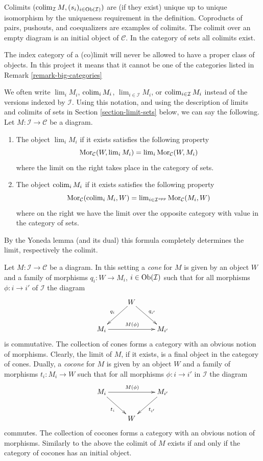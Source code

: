 \noindent
Colimits $(\mathop{\mathrm{colim}}\nolimits_\mathcal{I} M, (s_i)_{i\in \mathop{\mathrm{Ob}}\nolimits(\mathcal{I})})$ are
(if they exist) unique up to unique isomorphism by the uniqueness requirement
in the definition. Coproducts of pairs, pushouts, and coequalizers are
examples of colimits. The colimit over an empty diagram is an initial object
of $\mathcal{C}$. In the category of sets all colimits exist.

\begin{remark}
\label{remark-diagram-small}
The index category of a (co)limit will never be allowed to have
a proper class of objects. In this project it means that
it cannot be one of the categories listed in
Remark \ref{remark-big-categories}
\end{remark}

\begin{remark}
\label{remark-limit-colim}
We often write $\lim_i M_i$, $\mathop{\mathrm{colim}}\nolimits_i M_i$,
$\lim_{i\in \mathcal{I}} M_i$, or $\mathop{\mathrm{colim}}\nolimits_{i\in \mathcal{I}} M_i$
instead of the versions indexed by $\mathcal{I}$.
Using this notation, and using the description of
limits and colimits of sets in Section \ref{section-limit-sets}
below, we can say the following.
Let $M : \mathcal{I} \to \mathcal{C}$ be a diagram.
\begin{enumerate}
\item The object $\lim_i M_i$ if it exists satisfies the following property
$$
\mathop{\mathrm{Mor}}\nolimits_\mathcal{C}(W, \mathop{\mathrm{lim}}\nolimits_i M_i)
=
\mathop{\mathrm{lim}}\nolimits_i \mathop{\mathrm{Mor}}\nolimits_\mathcal{C}(W, M_i)
$$
where the limit on the right takes place in the category of sets.
\item The object $\mathop{\mathrm{colim}}\nolimits_i M_i$ if it
exists satisfies the following property
$$
\mathop{\mathrm{Mor}}\nolimits_\mathcal{C}(\mathop{\mathrm{colim}}\nolimits_i M_i, W)
=
\mathop{\mathrm{lim}}\nolimits_{i \in \mathcal{I}^{opp}} \mathop{\mathrm{Mor}}\nolimits_\mathcal{C}(M_i, W)
$$
where on the right we have the limit over the opposite category
with value in the category of sets.
\end{enumerate}
By the Yoneda lemma (and its dual) this formula completely determines the
limit, respectively the colimit.
\end{remark}

\begin{remark}
\label{remark-cones-and-cocones}
Let $M : \mathcal{I} \to \mathcal{C}$ be a diagram. In this setting a
{\it cone} for $M$ is given by an object $W$ and a family of morphisms
$q_i : W \to M_i$, $i \in \mathop{\mathrm{Ob}}\nolimits(\mathcal{I})$ such that for all morphisms
$\phi : i \to i'$ of $\mathcal{I}$ the diagram
$$
\xymatrix{
& W \ar[dl]_{q_i} \ar[dr]^{q_{i'}} \\
M_i \ar[rr]^{M(\phi)} & & M_{i'}
}
$$
is commutative. The collection of cones forms a category with an obvious
notion of morphisms. Clearly, the limit of $M$, if it exists, is a final
object in the category of cones. Dually, a {\it cocone} for $M$ is given
by an object $W$ and a family of morphisms $t_i : M_i \to W$ such that for
all morphisms $\phi : i \to i'$ in $\mathcal{I}$ the diagram
$$
\xymatrix{
M_i \ar[rr]^{M(\phi)} \ar[dr]_{t_i} & & M_{i'} \ar[dl]^{t_{i'}} \\
& W
}
$$
commutes. The collection of cocones forms a category with an obvious notion
of morphisms. Similarly to the above the colimit of $M$ exists
if and only if the category of cocones has an initial object.
\end{remark}

